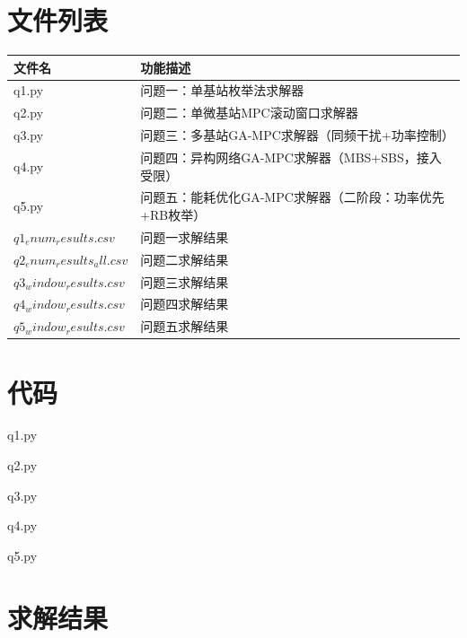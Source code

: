 \documentclass[withoutpreface,bwprint]{cumcmthesis}
\begin{document}
\newpage
\begin{appendices}
\section{文件列表}
\begin{table}[H]
\centering
\begin{tabularx}{\textwidth}{LL}
\toprule
文件名   & 功能描述 \\
\midrule
q1.py & 问题一：单基站枚举法求解器 \\
q2.py & 问题二：单微基站MPC滚动窗口求解器 \\
q3.py & 问题三：多基站GA-MPC求解器（同频干扰+功率控制） \\
q4.py & 问题四：异构网络GA-MPC求解器（MBS+SBS，接入受限） \\
q5.py & 问题五：能耗优化GA-MPC求解器（二阶段：功率优先+RB枚举） \\
$q1_enum_results.csv$ & 问题一求解结果 \\
$q2_enum_results_all.csv$ & 问题二求解结果 \\
$q3_window_results.csv$ & 问题三求解结果 \\
$q4_window_results.csv$ & 问题四求解结果 \\
$q5_window_results.csv$ & 问题五求解结果 \\
\bottomrule
\end{tabularx}
\label{tab:文件列表}
\end{table}

\section{代码}
q1.py

q2.py

q3.py

q4.py

q5.py


\section{求解结果}


\end{appendices}
\end{document}
